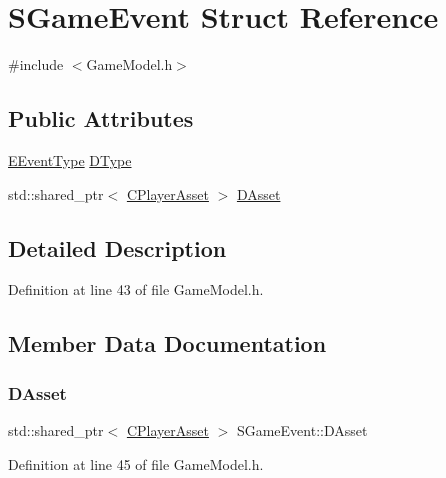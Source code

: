 \hypertarget{structSGameEvent}{}\section{S\+Game\+Event Struct Reference}
\label{structSGameEvent}


{\ttfamily \#include $<$Game\+Model.\+h$>$}

\subsection*{Public Attributes}
\begin{DoxyCompactItemize}
\item 
\hyperlink{GameModel_8h_abfcf510bafec7c6429906a6ecaac656d}{E\+Event\+Type} \hyperlink{structSGameEvent_afa10562e243f4ac2b473b655cc58fee7}{D\+Type}
\item 
std\+::shared\+\_\+ptr$<$ \hyperlink{classCPlayerAsset}{C\+Player\+Asset} $>$ \hyperlink{structSGameEvent_a40c85eeac83b96887b7449c9bdc5d624}{D\+Asset}
\end{DoxyCompactItemize}


\subsection{Detailed Description}


Definition at line 43 of file Game\+Model.\+h.



\subsection{Member Data Documentation}
\hypertarget{structSGameEvent_a40c85eeac83b96887b7449c9bdc5d624}{}\label{structSGameEvent_a40c85eeac83b96887b7449c9bdc5d624} 
\subsubsection{\texorpdfstring{D\+Asset}{DAsset}}
{\footnotesize\ttfamily std\+::shared\+\_\+ptr$<$ \hyperlink{classCPlayerAsset}{C\+Player\+Asset} $>$ S\+Game\+Event\+::\+D\+Asset}



Definition at line 45 of file Game\+Model.\+h.

\hypertarget{structSGameEvent_afa10562e243f4ac2b473b655cc58fee7}{}\label{structSGameEvent_afa10562e243f4ac2b473b655cc58fee7} 
